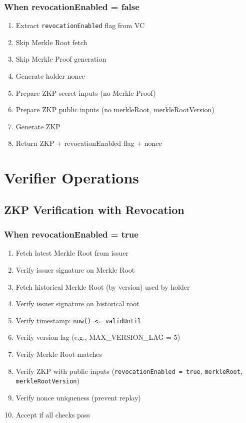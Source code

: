 \subsubsection{When revocationEnabled = false}

\begin{enumerate}
  \item Extract \texttt{revocationEnabled} flag from VC
  \item Skip Merkle Root fetch
  \item Skip Merkle Proof generation
  \item Generate holder nonce
  \item Prepare ZKP secret inputs (no Merkle Proof)
  \item Prepare ZKP public inputs (no merkleRoot, merkleRootVersion)
  \item Generate ZKP
  \item Return ZKP + revocationEnabled flag + nonce
\end{enumerate}

\section{Verifier Operations}

\subsection{ZKP Verification with Revocation}

\subsubsection{When revocationEnabled = true}

\begin{enumerate}
  \item Fetch latest Merkle Root from issuer
  \item Verify issuer signature on Merkle Root
  \item Fetch historical Merkle Root (by version) used by holder
  \item Verify issuer signature on historical root
  \item Verify timestamp: \texttt{now() <= validUntil}
  \item Verify version lag (e.g., MAX\_VERSION\_LAG = 5)
  \item Verify Merkle Root matches
  \item Verify ZKP with public inputs (\texttt{revocationEnabled = true}, \texttt{merkleRoot}, \texttt{merkleRootVersion})
  \item Verify nonce uniqueness (prevent replay)
  \item Accept if all checks pass
\end{enumerate}

